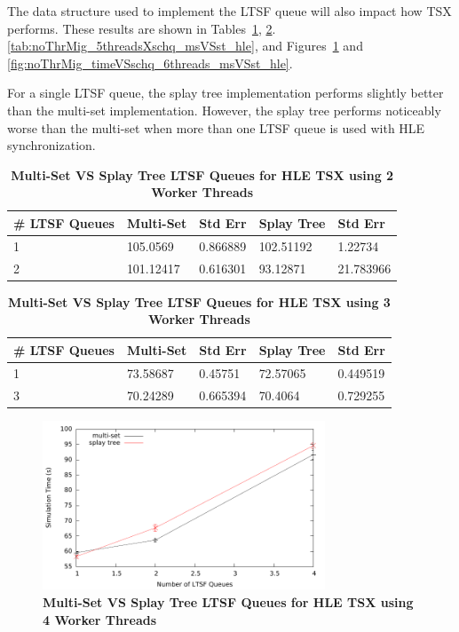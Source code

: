 \documentclass[11pt]{book}
\begin{document}
The data structure used to implement the LTSF queue will also impact how TSX performs.
These results are shown in Tables~\ref{tab:noThrMig_2threadsXschq_msVSst_hle},
\ref{tab:noThrMig_3threadsXschq_msVSst_hle}.  \ref{tab:noThrMig_5threadsXschq_msVSst_hle},
and Figures~\ref{fig:noThrMig_timeVSschq_4threads_msVSst_hle} and
\ref{fig:noThrMig_timeVSschq_6threads_msVSst_hle}.

For a single LTSF queue, the splay tree implementation performs slightly better than the
multi-set implementation.  However, the splay tree performs noticeably worse than the
multi-set when more than one LTSF queue is used with HLE synchronization.

\begin{table}
    \centering
    \begin{tabular}{l|p{2cm}|p{2cm}|p{2cm}|p{2cm}}
        \textbf{\# LTSF Queues}&Multi-Set &Std Err &Splay Tree &Std Err\\
        \hline
        \midrule
            1 &105.0569   &0.866889 &102.51192  &1.22734  \\ 
            2 &101.12417  &0.616301 &93.12871   &21.783966\\
    \end{tabular}
    \caption{\textbf{Multi-Set VS Splay Tree LTSF Queues for HLE TSX using 2 Worker
        Threads}}\label{tab:noThrMig_2threadsXschq_msVSst_hle}
\end{table}

\begin{table}
\centering
\begin{tabular}{l|p{2cm}|p{2cm}|p{2cm}|p{2cm}}
    \textbf{\# LTSF Queues}&Multi-Set &Std Err &Splay Tree &Std Err\\
    \hline
    \midrule
        1 &73.58687   &0.45751  &72.57065   &0.449519\\ 
        3 &70.24289   &0.665394 &70.4064    &0.729255\\
\end{tabular}
\caption{\textbf{Multi-Set VS Splay Tree LTSF Queues for HLE TSX using 3 Worker
    Threads}}\label{tab:noThrMig_3threadsXschq_msVSst_hle}
\end{table}

\begin{figure}
    \centering
    \graphicspath{ {./figures/} }
    \includegraphics[width=0.75\textwidth,keepaspectratio]{hugeepidemicsim-NOmig-timeVSschedQs-msVSst-4thread-hle}
\caption{\textbf{Multi-Set VS Splay Tree LTSF Queues for HLE TSX using 4 Worker
    Threads}}\label{fig:noThrMig_timeVSschq_4threads_msVSst_hle}
\end{figure}
\end{document}
